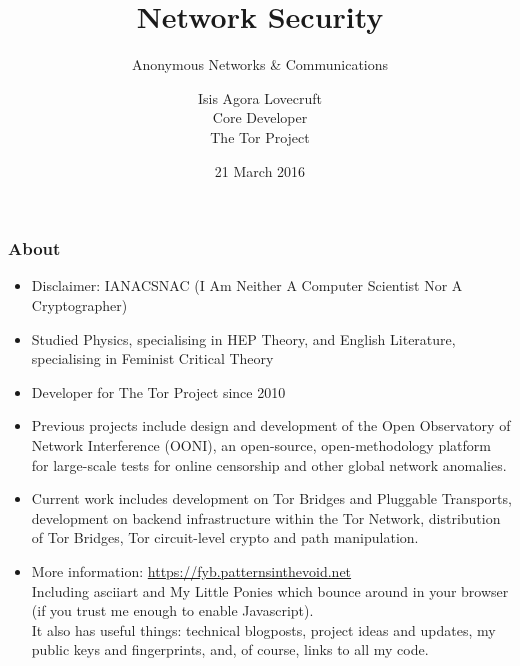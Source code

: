 



\title{Network Security}
\subtitle{Anonymous Networks \& Communications}
\date{21 March 2016}
\author{Isis Agora Lovecruft \\
  \small{Core Developer \\
         The Tor Project}
}

\frame[plain]{\titlepage}

\begin{frame}
  \frametitle{About}
  \begin{itemize}
    \item Disclaimer: IANACSNAC
      \tiny (I Am Neither A Computer Scientist Nor A Cryptographer) \normalsize
    \item<2-> Studied Physics, specialising in HEP Theory, and English Literature,
      specialising in Feminist Critical Theory
    \item<3-> Developer for The Tor Project since 2010
    \item<4-> Previous projects include design and development of the Open
      Observatory of Network Interference (OONI), an open-source,
      open-methodology platform for large-scale tests for online censorship and
      other global network anomalies.
    \item<5-> Current work includes development on Tor Bridges and
      Pluggable Transports, development on backend infrastructure
      within the Tor Network, distribution of Tor Bridges, Tor
      circuit-level crypto and path manipulation.
    \item<6-> More information: \url{https://fyb.patternsinthevoid.net} \\
      Including asciiart and My Little Ponies which bounce around in your
      browser (if you trust me enough to enable Javascript). \\
      It also has useful things: technical blogposts, project ideas and updates,
      my public keys and fingerprints, and, of course, links to all my code.
  \end{itemize}
\end{frame}

